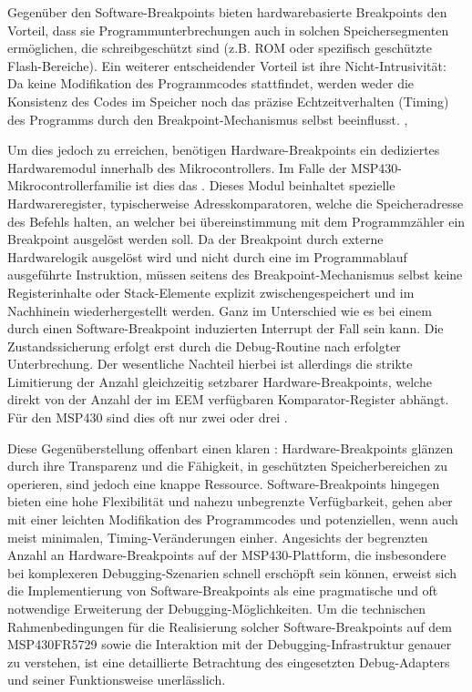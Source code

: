 Gegen\"uber den Software-Breakpoints bieten hardwarebasierte Breakpoints den Vorteil, dass sie Programmunterbrechungen auch in solchen Speichersegmenten erm\"oglichen, die schreibgesch\"utzt sind (z.B. ROM oder spezifisch gesch\"utzte Flash-Bereiche). Ein weiterer entscheidender Vorteil ist ihre Nicht-Intrusivit\"at: Da keine Modifikation des Programmcodes stattfindet, werden weder die Konsistenz des Codes im Speicher noch das pr\"azise Echtzeitverhalten (Timing) des Programms durch den Breakpoint-Mechanismus selbst beeinflusst. , 

Um dies jedoch zu erreichen, ben\"otigen Hardware-Breakpoints ein dediziertes Hardwaremodul innerhalb des Mikrocontrollers. Im Falle der MSP430-Mikrocontrollerfamilie ist dies das  . Dieses Modul beinhaltet spezielle Hardwareregister, typischerweise Adresskomparatoren, welche die Speicheradresse des Befehls halten, an welcher bei \"ubereinstimmung mit dem Programmz\"ahler ein Breakpoint ausgel\"ost werden soll. Da der Breakpoint durch externe Hardwarelogik ausgel\"ost wird und nicht durch eine im Programmablauf ausgef\"uhrte Instruktion, m\"ussen seitens des Breakpoint-Mechanismus selbst keine Registerinhalte oder Stack-Elemente explizit zwischengespeichert und im Nachhinein wiederhergestellt werden. Ganz im Unterschied wie es bei einem durch einen Software-Breakpoint induzierten Interrupt der Fall sein kann. Die Zustandssicherung erfolgt erst durch die Debug-Routine nach erfolgter Unterbrechung. Der wesentliche Nachteil hierbei ist allerdings die strikte Limitierung der Anzahl gleichzeitig setzbarer Hardware-Breakpoints, welche direkt von der Anzahl der im EEM verf\"ugbaren Komparator-Register abh\"angt. F\"ur den MSP430 sind dies oft nur zwei oder drei .

Diese Gegen\"uberstellung offenbart einen klaren : Hardware-Breakpoints gl\"anzen durch ihre Transparenz und die F\"ahigkeit, in gesch\"utzten Speicherbereichen zu operieren, sind jedoch eine knappe Ressource. Software-Breakpoints hingegen bieten eine hohe Flexibilit\"at und nahezu unbegrenzte Verf\"ugbarkeit, gehen aber mit einer leichten Modifikation des Programmcodes und potenziellen, wenn auch meist minimalen, Timing-Ver\"anderungen einher. Angesichts der begrenzten Anzahl an Hardware-Breakpoints auf der MSP430-Plattform, die insbesondere bei komplexeren Debugging-Szenarien schnell ersch\"opft sein k\"onnen, erweist sich die Implementierung von Software-Breakpoints als eine pragmatische und oft notwendige Erweiterung der Debugging-M\"oglichkeiten. Um die technischen Rahmenbedingungen f\"ur die Realisierung solcher Software-Breakpoints auf dem MSP430FR5729 sowie die Interaktion mit der Debugging-Infrastruktur genauer zu verstehen, ist eine detaillierte Betrachtung des eingesetzten Debug-Adapters und seiner Funktionsweise unerl\"asslich. 

